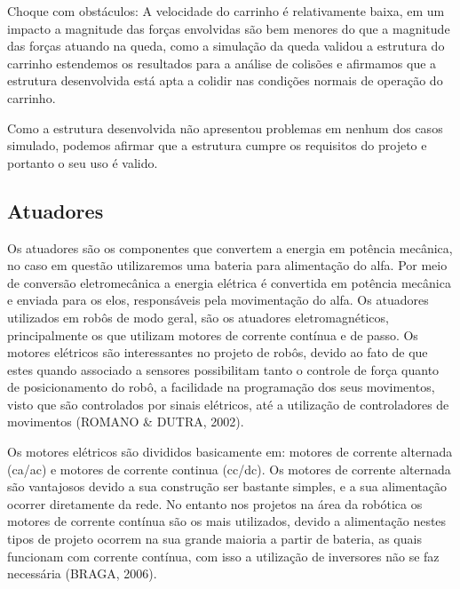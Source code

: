 Choque com obstáculos: A velocidade do carrinho é relativamente baixa, em um impacto a magnitude das forças envolvidas são bem menores do que a magnitude das forças atuando na queda, como a simulação da queda validou a estrutura do carrinho estendemos os resultados para a análise de colisões e afirmamos que a estrutura desenvolvida está apta a colidir nas condições normais de operação do carrinho.
 
Como a estrutura desenvolvida não apresentou problemas em nenhum dos casos simulado, podemos afirmar que a estrutura cumpre os requisitos do projeto e portanto o seu uso é valido.

\subsection{Atuadores}

Os atuadores são os componentes que convertem a energia em potência mecânica, no caso em questão utilizaremos uma bateria para alimentação do alfa. Por meio de conversão eletromecânica a energia elétrica é convertida em potência mecânica e enviada para os elos, responsáveis pela movimentação do alfa.  Os atuadores utilizados em robôs de modo geral, são os atuadores eletromagnéticos, principalmente os que utilizam motores de corrente contínua e de passo. Os motores elétricos são interessantes no projeto de robôs, devido ao fato de que estes quando associado a sensores possibilitam tanto o controle de força quanto de posicionamento do robô, a facilidade na programação dos seus movimentos, visto que são controlados por sinais elétricos, até a utilização de controladores de movimentos (ROMANO \& DUTRA, 2002).

Os motores elétricos são divididos basicamente em: motores de corrente alternada (ca/ac) e motores de corrente continua (cc/dc). Os motores de corrente alternada são vantajosos devido a sua construção ser bastante simples, e a sua alimentação ocorrer diretamente da rede. No entanto nos projetos na área da robótica os motores de corrente contínua são os mais utilizados, devido a alimentação nestes tipos de projeto ocorrem na sua grande maioria a partir de bateria, as quais funcionam com corrente contínua, com isso a utilização de inversores não se faz necessária (BRAGA, 2006).


